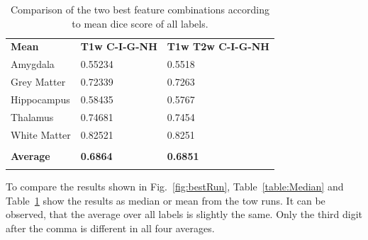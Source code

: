\documentclass[conference]{IEEEtran}
\begin{document}
\begin{table}[h!]
\begin{tabular}{lll}
\textbf{Mean}    & \textbf{T1w C-I-G-NH} & \textbf{T1w T2w C-I-G-NH} \\
Amygdala         & 0.55234               & 0.5518                    \\
Grey Matter      & 0.72339               & 0.7263                    \\
Hippocampus      & 0.58435               & 0.5767                    \\
Thalamus         & 0.74681               & 0.7454                    \\
White Matter     & 0.82521               & 0.8251                    \\
                 &                       &                           \\
\textbf{Average} & \textbf{0.6864}       & \textbf{0.6851}           \\
\\
\end{tabular}
\caption{Comparison of the two best feature combinations according to mean dice score of all labels.}
\label{table:Mean}
\end{table}


To compare the results shown in Fig.~\ref{fig:bestRun}, Table~\ref{table:Median} and Table~\ref{table:Mean} show the results as median or mean from the tow runs. It can be observed, that the average over all labels is slightly the same. Only the third digit after the comma is different in all four averages. 






\end{document}
